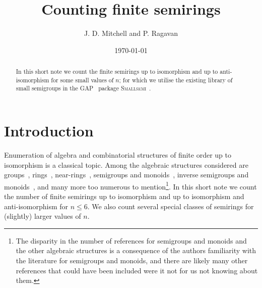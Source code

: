 \documentclass{article}
\title{Counting finite semirings}
\author{J. D. Mitchell and P. Ragavan}
\date{\today}
\theoremstyle{definition}
\theoremstyle{plain}
\newcommand{\GAP}{\textsc{GAP}~\cite{GAP4}\xspace}
\newcommand{\Smallsemi}{\textsc{Smallsemi}~\cite{Smallsemi}\xspace}
\begin{document}
\maketitle

\begin{abstract}
  In this short note we count the finite semirings up to isomorphism
  and up to anti-isomorphism for some small values of $n$; for which we
  utilise the existing library of small semigroups in the \GAP
  package \Smallsemi.
\end{abstract}

\section{Introduction}


Enumeration of algebra and combinatorial structures of finite order up to
isomorphism is a classical topic. Among the algebraic structures considered are
groups~\cite{BESCHE2002,A000001}, rings~\cite{Blackburn2022, Fine1993,
Kruse1970, A027623}, near-rings~\cite{Chow2024, SONATA, A305858},
semigroups and monoids~\cite{Distler2010, Distler2010, Distler2013,
  Forsythe1955, Grillet1996, Grillet2014, Jrgensen1977, Motzkin1955,
Plemmons1967, A027851, A058129, Satoh1994, A001426, A001423},
inverse semigroups and monoids~\cite{Malandro2019, A001428, A234843,
A234844, A234845}, and many more too numerous to mention\footnote{The disparity
  in the number of references for semigroups and monoids and the other
  algebraic structures is a consequence of the authors familiarity with the
  literature for semigroups and monoids, and there are likely many other
  references that could have been included were it not for us not knowing about
them.}. In this short note we count the number of finite semirings up to
isomorphism and up to isomorphism and anti-isomorphism for $n \leq 6$. We also
count several special classes of semirings for (slightly) larger values of $n$.
\end{document}
